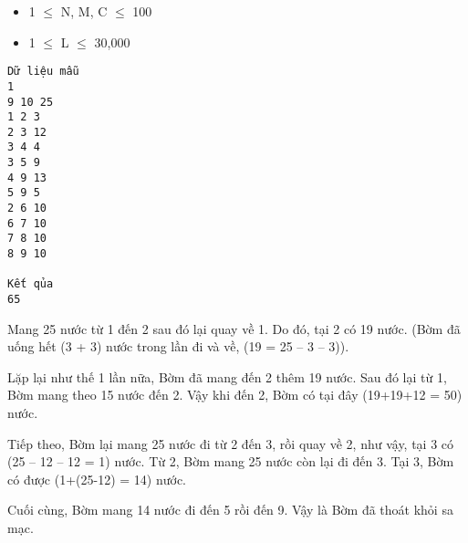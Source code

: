 \begin{itemize}
	\item 1  $\le$  N, M, C  $\le$  100
	\item 1  $\le$  L  $\le$  30,000
\end{itemize}
\begin{verbatim}
Dữ liệu mẫu
1
9 10 25 
1 2 3 
2 3 12 
3 4 4 
3 5 9 
4 9 13 
5 9 5 
2 6 10 
6 7 10 
7 8 10 
8 9 10 

Kết qủa
65 
\end{verbatim}
Mang 25 nước từ 1 đến 2 sau đó lại quay về 1. Do đó, tại 2 có 19 nước. (Bờm đã uống hết (3 + 3) nước trong lần đi và về, (19 = 25 – 3 – 3)).

Lặp lại như thế 1 lần nữa, Bờm đã mang đến 2 thêm 19 nước. Sau đó lại từ 1, Bờm mang theo 15 nước đến 2. Vậy khi đến 2, Bờm có tại đây (19+19+12 = 50) nước.

Tiếp theo, Bờm lại mang 25 nước đi từ 2 đến 3, rồi quay về 2, như vậy, tại 3 có (25 – 12 – 12 = 1) nước. Từ 2, Bờm mang 25 nước còn lại đi đến 3. Tại 3, Bờm có được (1+(25-12) = 14) nước.

Cuối cùng, Bờm mang 14 nước đi đến 5 rồi đến 9. Vậy là Bờm đã thoát khỏi sa mạc.
